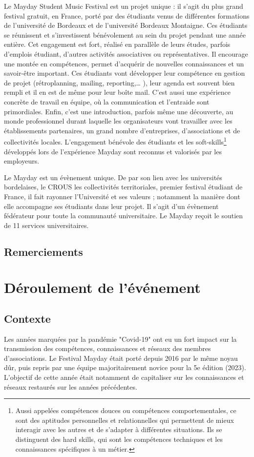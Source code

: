 \documentclass[12pt,a4paper]{report}
\begin{document}
Le Mayday Student Music Festival est un projet unique : il s'agit du plus grand festival gratuit, en France, porté par des étudiants venus de différentes formations de l’université de Bordeaux et de l’université Bordeaux Montaigne. Ces étudiants se réunissent et s’investissent bénévolement au sein du projet pendant une année entière. Cet engagement est fort, réalisé en parallèle de leurs études, parfois d’emplois étudiant, d’autres activités associatives ou représentatives. Il encourage une montée en compétences, permet d'acquérir de nouvelles connaissances et un savoir-être important. Ces étudiants vont développer leur compétence en gestion de projet (rétroplanning, mailing, reporting,… ), leur agenda est souvent bien rempli et il en est de même pour leur boîte mail. C’est aussi une expérience concrète de travail en équipe, où la communication et l'entraide sont primordiales. Enfin, c’est une introduction, parfois même une découverte, au monde professionnel durant laquelle les organisateurs vont travailler avec les établissements partenaires, un grand nombre d'entreprises, d’associations et de collectivités locales. L’engagement bénévole des étudiants et les soft-skills\footnote{ Aussi appelées compétences douces ou compétences comportementales, ce sont des aptitudes personnelles et relationnelles qui permettent de mieux interagir avec les autres et de s'adapter à différentes situations. Ils se distinguent des hard skills, qui sont les compétences techniques et les connaissances spécifiques à un métier.} développés lors de l’expérience Mayday sont reconnus et valorisés par les employeurs.

Le Mayday est un évènement unique. De par son lien avec les universités bordelaises, le CROUS les collectivités territoriales, premier festival étudiant de France, il fait rayonner l’Université et ses valeurs ; notamment la manière dont elle accompagne ses étudiants dans leur projet. Il s’agit d’un évènement fédérateur pour toute la communauté universitaire. Le Mayday reçoit le soutien de 11 services universitaires. 

\section*{Remerciements}

\newpage

\chapter{Déroulement de l'événement}
\section{Contexte}
Les années marquées par la pandémie "Covid-19" ont eu un fort impact sur la transmission des compétences, connaissances et réseaux des membres d'associations. Le Festival Mayday était porté depuis 2016 par le même noyau dûr, puis repris par une équipe majoritairement novice pour la 5e édition (2023). L'objectif de cette année était notamment de capitaliser sur les connaissances et réseaux restaurés sur les années précédentes. 
\end{document}
